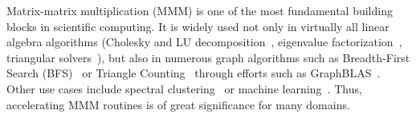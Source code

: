 \documentclass[sigplan,review,anonymous]{acmart}\settopmatter{printfolios=true,printccs=false,printacmref=false}
\begin{document}

Matrix-matrix multiplication (MMM) is one of the most fundamental building
blocks in scientific computing. It is widely used not only in virtually all
linear algebra algorithms (Cholesky and LU
decomposition~\cite{meyer2000matrix}, eigenvalue
factorization~\cite{chatelin2012eigenvalues}, triangular
solvers~\cite{linearAlgebraLAPACK}), but also in numerous graph algorithms such
as Breadth-First Search (BFS)~\cite{cormen2009introduction} or Triangle
Counting~\cite{azad2015parallel} through efforts such as
GraphBLAS~\cite{kepner2016mathematical}. Other use cases include spectral
clustering~\cite{ng2002spectral} or machine
learning~\cite{abadi2016tensorflow}.  Thus, accelerating MMM routines is of
great significance for many domains.
\end{document}
